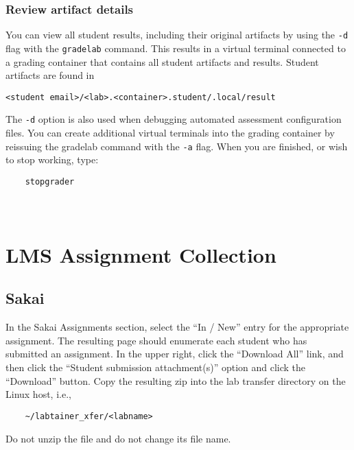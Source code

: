 \documentclass[12pt]{article}
\begin{document}
\subsubsection{Review artifact details}
You can view all student results, including their original artifacts by using the {\tt -d} flag
with the {\tt gradelab} command.  This results in a virtual terminal connected to a grading
container that contains all student artifacts and results.  Student artifacts are found in 
\begin{verbatim}
<student email>/<lab>.<container>.student/.local/result
\end{verbatim}

\noindent The {\tt -d} option is also used when debugging automated assessment configuration
files.  You can create additional virtual terminals into the grading container by reissuing
the gradelab command with the {\tt -a} flag.  When you are finished, or wish to stop working, type:
\begin{verbatim}
    stopgrader
\end{verbatim}

\newpage
\appendix
\section{\\LMS Assignment Collection}
\label{lms collection}
\subsection{Sakai}
In the Sakai Assignments section, select the ``In / New'' entry for the appropriate assignment.
The resulting page should enumerate each student who has submitted an assignment.  In the upper right,
click the ``Download All'' link, and then click the ``Student submission attachment(s)'' option and
click the ``Download'' button.  Copy the resulting zip into the lab transfer directory 
on the Linux host, i.e.,
\begin{verbatim}
    ~/labtainer_xfer/<labname>
\end{verbatim}
\noindent Do not unzip the file and do not change its file name.
\end{document}
